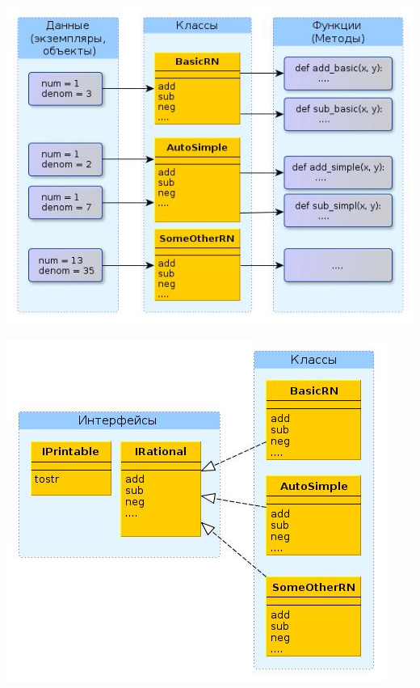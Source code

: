 \documentclass{article}
\begin{document}
\begin{center} \includegraphics[scale=0.8]{images/oop_style.jpg} \end{center} 
\newpage

\begin{center} \includegraphics[scale=0.8]{images/interfaces.jpg} \end{center} 
\newpage
\end{document}
